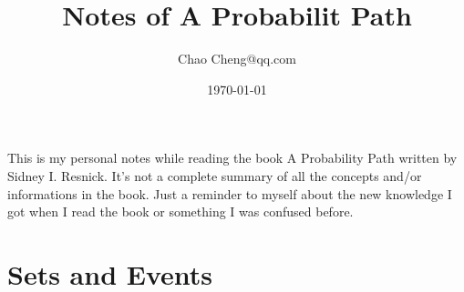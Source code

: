 \documentclass[a4paper,12pt]{article}
\title{Notes of A Probabilit Path}
\author{Chao Cheng\quad 413557584@qq.com}
\date{\today}
\begin{document}
\maketitle

This is my personal notes while reading the book A Probability Path written by Sidney I. Resnick. It's not a complete summary of all the concepts and/or informations in the book. Just a reminder to myself about the new knowledge I got when I read the book or something I was confused before. 

\section{Sets and Events}
\label{sec:sets-events}









\clearpage
\appendix
\end{document}
